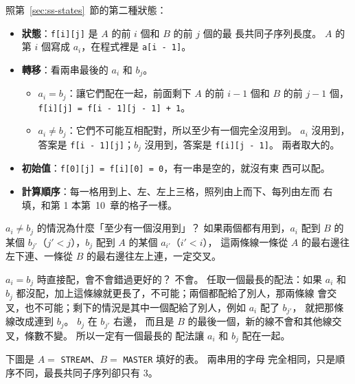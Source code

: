 照第~\ref{sec:ss-states}~節的第二種狀態：

\begin{itemize}
\item \textbf{狀態}：\texttt{f[i][j]} 是 $A$ 的前 $i$ 個和 $B$ 的前 $j$ 個的最
長共同子序列長度。 $A$ 的第 $i$ 個寫成 $a_i$，在程式裡是 \texttt{a[i - 1]}。
\item \textbf{轉移}：看兩串最後的 $a_i$ 和 $b_j$。
  \begin{itemize}
  \item $a_i = b_j$：讓它們配在一起，前面剩下 $A$ 的前 $i - 1$ 個和 $B$ 的前
  $j - 1$ 個，\texttt{f[i][j] = f[i - 1][j - 1] + 1}。
  \item $a_i \ne b_j$：它們不可能互相配對，所以至少有一個完全沒用到。 $a_i$
  沒用到，答案是 \texttt{f[i - 1][j]}；$b_j$ 沒用到，答案是
  \texttt{f[i][j - 1]}。 兩者取大的。
  \end{itemize}
\item \textbf{初始值}：\texttt{f[0][j] = f[i][0] = 0}，有一串是空的，就沒有東
西可以配。
\item \textbf{計算順序}：每一格用到上、左、左上三格，照列由上而下、每列由左而
右填，和第 1 本第~10~章的格子一樣。
\end{itemize}

$a_i \ne b_j$ 的情況為什麼「至少有一個沒用到」？ 如果兩個都有用到，$a_i$ 配到
$B$ 的某個 $b_{j'}$（$j' < j$），$b_j$ 配到 $A$ 的某個 $a_{i'}$（$i' < i$），
這兩條線一條從 $A$ 的最右邊往左下連、一條從 $B$ 的最右邊往左上連，一定交叉。

$a_i = b_j$ 時直接配，會不會錯過更好的？ 不會。 任取一個最長的配法：如果
$a_i$ 和 $b_j$ 都沒配，加上這條線就更長了，不可能；兩個都配給了別人，那兩條線
會交叉，也不可能；剩下的情況是其中一個配給了別人，例如 $a_i$ 配了 $b_{j'}$，
就把那條線改成連到 $b_j$。 $b_j$ 在 $b_{j'}$ 右邊，
而且是 $B$ 的最後一個，新的線不會和其他線交叉，條數不變。 所以一定有一個最長的
配法讓 $a_i$ 和 $b_j$ 配在一起。

下圖是 $A = $ \texttt{STREAM}、$B = $ \texttt{MASTER} 填好的表。 兩串用的字母
完全相同，只是順序不同，最長共同子序列卻只有 $3$。

